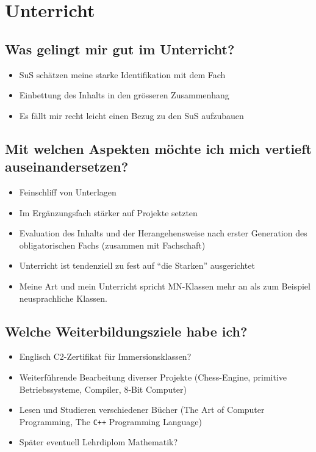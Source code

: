 \section{Unterricht}
\subsection{Was gelingt mir gut im Unterricht?}
\begin{itemize}
	\item SuS schätzen meine starke Identifikation mit dem Fach
	\item Einbettung des Inhalts in den grösseren Zusammenhang
	\item Es fällt mir recht leicht einen Bezug zu den SuS aufzubauen
\end{itemize}
\subsection{Mit welchen Aspekten möchte ich mich vertieft auseinandersetzen?}
\begin{itemize}
	\item Feinschliff von Unterlagen
	\item Im Ergänzungsfach stärker auf Projekte setzten
	\item Evaluation des Inhalts und der Herangehensweise nach erster Generation des obligatorischen Fachs (zusammen mit Fachschaft)
	\item Unterricht ist tendenziell zu fest auf \enquote{die Starken} ausgerichtet
	\item Meine Art und mein Unterricht spricht MN-Klassen mehr an als zum Beispiel neusprachliche Klassen.
\end{itemize}
\subsection{Welche Weiterbildungsziele habe ich?}
\begin{itemize}
	\item Englisch C2-Zertifikat für Immersionsklassen?
	\item Weiterführende Bearbeitung diverser Projekte (Chess-Engine, primitive Betriebssysteme, Compiler, 8-Bit Computer)
	\item Lesen und Studieren verschiedener Bücher (The Art of Computer Programming, The \texttt{C++} Programming Language)
	\item Später eventuell Lehrdiplom Mathematik?
\end{itemize}

